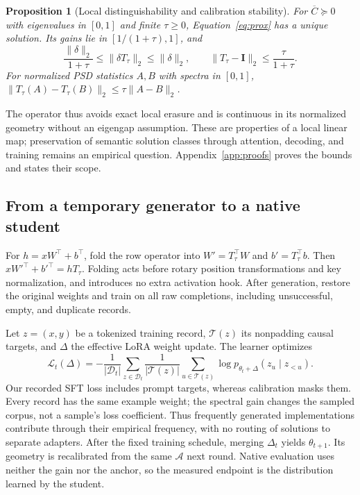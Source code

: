 \documentclass{article}
\newcommand{\I}{\mathbf I}
\newcommand{\cA}{\mathcal A}
\newcommand{\cD}{\mathcal D}
\newcommand{\Cbar}{\overline C}
\newtheorem{proposition}{Proposition}
\begin{document}
\begin{proposition}[Local distinguishability and calibration stability]
\label{prop:prox}
For $\Cbar\succeq0$ with eigenvalues in $[0,1]$ and finite $\tau\ge0$, Equation~\eqref{eq:prox} has a unique solution. Its gains lie in $[1/(1+\tau),1]$, and
\begin{equation}
\frac{\|\delta\|_2}{1+\tau}\le\|\delta T_\tau\|_2\le\|\delta\|_2,
\qquad \|T_\tau-\I\|_2\le\frac{\tau}{1+\tau}.
\label{eq:bound}
\end{equation}
For normalized PSD statistics $A,B$ with spectra in $[0,1]$,
$\|T_\tau(A)-T_\tau(B)\|_2\le\tau\|A-B\|_2$.
\end{proposition}
The operator thus avoids exact local erasure and is continuous in its normalized geometry without an eigengap assumption. These are properties of a local linear map; preservation of semantic solution classes through attention, decoding, and training remains an empirical question. Appendix~\ref{app:proofs} proves the bounds and states their scope.

\subsection{From a temporary generator to a native student}
For $h=xW^\top+b^\top$, fold the row operator into $W'=T_\tau^\top W$ and $b'=T_\tau^\top b$. Then $xW'^\top+b'^\top=hT_\tau$. Folding acts before rotary position transformations and key normalization, and introduces no extra activation hook. After generation, restore the original weights and train on all raw completions, including unsuccessful, empty, and duplicate records.

Let $z=(x,y)$ be a tokenized training record, $\mathcal T(z)$ its nonpadding causal targets, and $\Delta$ the effective LoRA weight update. The learner optimizes
\begin{equation}
\mathcal L_t(\Delta)=-\frac{1}{|\cD_t|}\sum_{z\in\cD_t}
\frac{1}{|\mathcal T(z)|}\sum_{u\in\mathcal T(z)}
\log p_{\theta_t+\Delta}(z_u\mid z_{<u}).
\label{eq:student}
\end{equation}
Our recorded SFT loss includes prompt targets, whereas calibration masks them. Every record has the same example weight; the spectral gain changes the sampled corpus, not a sample's loss coefficient. Thus frequently generated implementations contribute through their empirical frequency, with no routing of solutions to separate adapters. After the fixed training schedule, merging $\Delta_t$ yields $\theta_{t+1}$. Its geometry is recalibrated from the same $\cA$ next round. Native evaluation uses neither the gain nor the anchor, so the measured endpoint is the distribution learned by the student.
\end{document}
